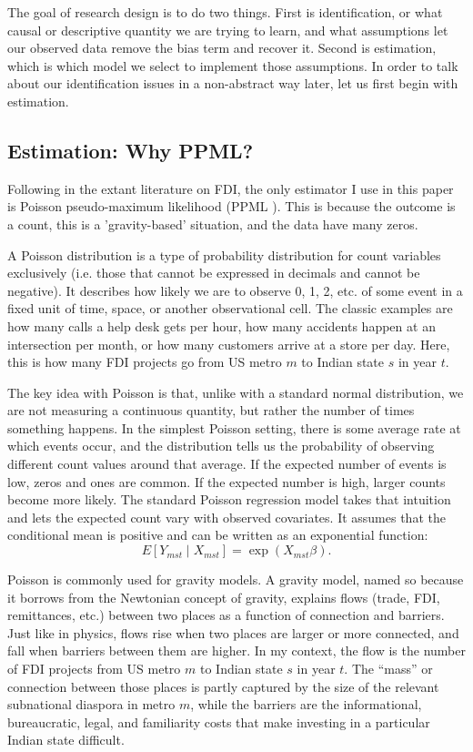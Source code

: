 \documentclass[12pt]{article}
\let\oldsubsection\subsection
\renewcommand{\subsection}{\FloatBarrier\oldsubsection}
\begin{document}
    The goal of research design is to do two things. First is identification, or what causal or descriptive quantity we are trying to learn, and what assumptions let our observed data remove the bias term and recover it. Second is estimation, which is which model we select to implement those assumptions. In order to talk about our identification issues in a non-abstract way later, let us first begin with estimation.

\subsection{Estimation: Why PPML?} \label{ss:why_ppml}
    
   Following in the extant literature on FDI, the only estimator I use in this paper is Poisson pseudo-maximum likelihood (PPML \citep{li_repelling_2026}). This is because the outcome is a count, this is a 'gravity-based' situation, and the data have many zeros.
    
    A Poisson distribution is a type of probability distribution for count variables exclusively (i.e. those that cannot be expressed in decimals and cannot be negative). It describes how likely we are to observe 0, 1, 2, etc. of some event in a fixed unit of time, space, or another observational cell. The classic examples are how many calls a help desk gets per hour, how many accidents happen at an intersection per month, or how many customers arrive at a store per day.  Here, this is how many FDI projects go from US metro $m$ to Indian state $s$ in year $t$. 

    
    The key idea with Poisson is that, unlike with a standard normal distribution, we are not measuring a continuous quantity, but rather the number of times something happens. In the simplest Poisson setting, there is some average rate at which events occur, and the distribution tells us the probability of observing different count values around that average. If the expected number of events is low, zeros and ones are common. If the expected number is high, larger counts become more likely. The standard Poisson regression model takes that intuition and lets the expected count vary with observed covariates. It assumes that the conditional mean is positive and can be written as an exponential function:
\[
E[Y_{mst} \mid X_{mst}] = \exp(X_{mst}\beta).
\]

Poisson is commonly used for gravity models. A gravity model, named so because it borrows from the Newtonian concept of gravity, explains flows (trade, FDI,  remittances, etc.) between two places as a function of connection and barriers. Just like in physics, flows rise when two places are larger or more connected, and fall  when barriers between them are higher.   In my context, the flow is the number of FDI projects from US metro $m$ to Indian state $s$ in year $t$. The ``mass'' or connection between those places is partly captured by the size of the relevant subnational diaspora in metro $m$, while the barriers are the informational, bureaucratic, legal, and familiarity costs that make investing in a particular Indian state difficult.
\end{document}
